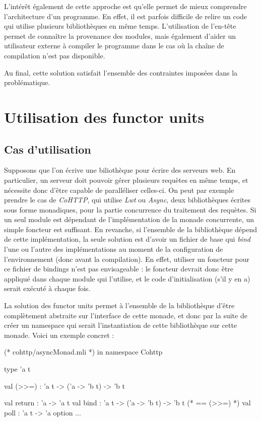 \documentclass[11pt,a4paper]{report}
\begin{document}
L'intérêt également de cette approche est qu'elle permet de mieux comprendre
l'architecture d'un programme. En effet, il est parfois difficile de relire un
code qui utilise plusieurs bibliothèques en même temps. L'utilisation de
l'en-tête permet de connaître la provenance des modules, mais également d'aider
un utilisateur externe à compiler le programme dans le cas où la chaîne de
compilation n'est pas disponible.

Au final, cette solution satisfait l'ensemble des contraintes imposées dans la
problématique.

\section{Utilisation des functor units}

\subsection{Cas d'utilisation}

Supposons que l'on écrive une biliothèque pour écrire des serveurs web. En
particulier, un serveur doit pouvoir gérer plusieurs requètes en même temps, et
nécessite donc d'être capable de paralléliser celles-ci. On peut par exemple
prendre le cas de \emph{CoHTTP}, qui utilise \emph{Lwt} ou \emph{Async}, deux
bibliothèques écrites sous forme monadiques, pour la partie concurrence du
traitement des requètes. Si un seul module est dépendant de l'implémentation de
la monade concurrente, un simple foncteur est suffisant. En revanche, si
l'ensemble de la bibliothèque dépend de cette implémentation, la seule solution
est d'avoir un fichier de base qui \emph{bind} l'une ou l'autre des
implémentations au moment de la configuration de l'environnement (donc avant la
compilation). En effet, utiliser un foncteur pour ce fichier de bindings n'est
pas envisageable : le foncteur devrait donc être appliqué dans chaque module qui
l'utilise, et le code d'initialisation (s'il y en a) serait exécuté à chaque
fois.

La solution des functor units permet à l'ensemble de la bibliothèque d'être
complètement abstraite sur l'interface de cette monade, et donc par la suite de
créer un namespace qui serait l'instantiation de cette bibliothèque sur cette
monade. Voici un exemple concret :

\begin{OCaml}
(* cohttp/asyncMonad.mli *)
in namespace Cohttp

type 'a t

val (>>=) : 'a t -> ('a -> 'b t) -> 'b t

val return : 'a -> 'a t
val bind : 'a t -> ('a -> 'b t) -> 'b t (* == (>>=) *)
val poll : 'a t -> 'a option
...
\end{OCaml}
\end{document}
